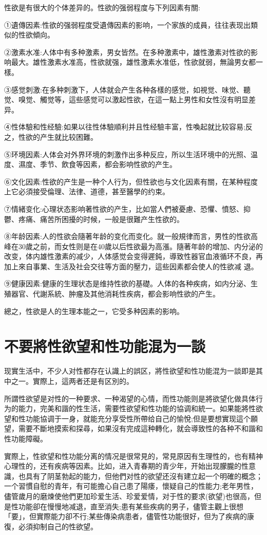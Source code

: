 \documentclass[12pt,UTF8]{ctexbook}
\begin{document}
性欲是有很大的个体差异的。性欲的强弱程度与下列因素有關:

①遺傳因素:性欲的强弱程度受遺傳因素的影响，一个家族的成員，往往表现出類似的性欲傾向。

②激素水准:人体中有多种激素，男女皆然。在多种激素中，雄性激素对性欲的影响最大。雄性激素水准高，性欲就强，雄性激素水准低，性欲就弱，無論男女都一樣。

③感觉刺激:在多种刺激下，人体就会产生各种各樣的感觉，如視觉、味觉、聽觉、嗅觉、觸觉等，這些感觉可以激起性欲，在這一點上男性和女性沒有明显差异。

④性体驗和性经驗:如果以往性体驗順利并且性经驗丰富，性喚起就比较容易;反之，性欲的产生就比较困難。

⑤环境因素:人体会对外界环境的刺激作出多种反应，所以生活环境中的光照、温度、濕度、季节、飲食等因素，都会影响性欲的产生。

⑥文化因素:性欲的产生是一种个人行为，但性欲也与文化因素有關，在某种程度上它必須接受倫理、法律、道德，甚至醫學的约束。

⑦情緒变化:心理状态影响著性欲的产生，比如當人們被憂慮、恐懼、憤怒、抑鬱、疼痛、痛苦所困擾的时候，一般是很難产生性欲的。

⑧年龄因素:人的性欲会隨著年龄的变化而变化。就一般規律而言，男性的性欲高峰在30歲之前，而女性则是在40歲以后性欲最为高漲。隨著年龄的增加、内分泌的改变，体内雄性激素的减少，人体感觉会变得遲鈍，導致性器官血液循环不良，再加上來自事業、生活及社会交往等方面的壓力，這些因素都会使人的性欲减
退。

⑨健康因素:健康的生理状态是维持性欲的基礎。人体的各种疾病，如内分泌、生殖器官、代謝系統、肿瘤及其他消耗性疾病，都会影响性欲的产生。

總之，性欲是人的生理本能之一，它受多种因素的影响。

\section{不要將性欲望和性功能混为一談}

现實生活中，不少人对性都存在认識上的誤区，將性欲望和性功能混为一談即是其中之一。實際上，這两者还是有区別的。

所謂性欲望是对性的一种要求、一种渴望的心情，而性功能则是將欲望化做具体行为的能力，完美和諧的性生活，需要性欲望和性功能的協调和統一。如果能將性欲望和性功能協调于一身，就能充分享受性所帶给自己的愉悅;但是要想實现這个願望，需要不斷地摸索和探尋，如果沒有完成這种轉化，就会導致性的各种不和諧和性功能障礙。

實際上，性欲望和性功能分离的情况是很常見的，常見原因有生理性的，也有精神心理性的，还有疾病等因素。比如，进入青春期的青少年，开始出现朦朧的性意識，也具有了阴茎勃起的能力，但他們对性的欲望还沒有建立起一个明確的概念；一个習慣自慰的青年，有可能擔心自己患了陽痿，懷疑自己的性能力;老年男性，儘管歲月的磨煉使他們更加珍爱生活、珍爱爱情，对于性的要求(欲望)也很高，但是性功能卻在慢慢地减退，直至消失;患有某些疾病的男子，儘管主觀上很想「要」，但實際能力卻不行;某些傳染病患者，儘管性功能很好，但为了疾病的康復，必須抑制自己的性欲望。
\end{document}
